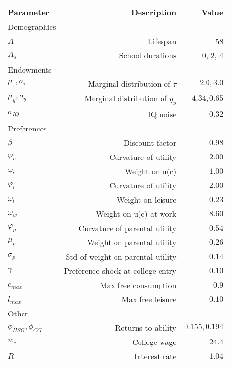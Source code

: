 \begin{tabular}{lrr}
\hline
Parameter & Description  & Value  \\ 
\hline
Demographics &   &   \\ 
$A$ & Lifespan  & 58  \\ 
$A_{s}$ & School durations  & 0, 2, 4  \\ 
Endowments &   &   \\ 
$\mu_{\tau}, \sigma_{\tau}$ & Marginal distribution of $\tau$  & $2.0, 3.0$  \\ 
$\mu_{y}, \sigma_{y}$ & Marginal distribution of $y_{p}$  & $4.34, 0.65$  \\ 
$\sigma_{IQ}$ & IQ noise  & $0.32$  \\ 
Preferences &   &   \\ 
$\beta$ & Discount factor  & $0.98$  \\ 
$\varphi_{c}$ & Curvature of utility  & $2.00$  \\ 
$\omega_{c}$ & Weight on u(c)  & $1.00$  \\ 
$\varphi_{l}$ & Curvature of utility  & $2.00$  \\ 
$\omega_{l}$ & Weight on leisure  & $0.23$  \\ 
$\omega_{w}$ & Weight on u(c) at work  & $8.60$  \\ 
$\varphi_{p}$ & Curvature of parental utility  & $0.54$  \\ 
$\mu_{p}$ & Weight on parental utility  & $0.26$  \\ 
$\sigma_{p}$ & Std of weight on parental utility  & $0.14$  \\ 
$\gamma$ & Preference shock at college entry  & $0.10$  \\ 
$\bar{c}_{max}$ & Max free consumption  & $0.9$  \\ 
$\bar{l}_{max}$ & Max free leisure  & $0.10$  \\ 
Other &   &   \\ 
$\phi_{HSG}, \phi_{CG}$ & Returns to ability  & $0.155, 0.194$  \\ 
$w_{c}$ & College wage  & $24.4$  \\ 
$R$ & Interest rate  & $1.04$  \\ 
\hline
\end{tabular}%
